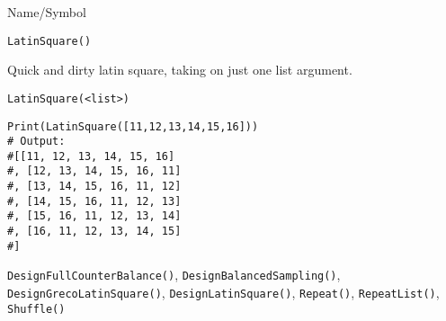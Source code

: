 \begin{desc}{Name/Symbol}
\item[Name/Symbol]	\verb+LatinSquare()+

\item[Description]	Quick and dirty latin square, taking on just one
  list argument.

\item[Usage]
\begin{verbatim}
LatinSquare(<list>)
\end{verbatim}

\item[Example]
\begin{verbatim}
Print(LatinSquare([11,12,13,14,15,16]))
# Output:
#[[11, 12, 13, 14, 15, 16]
#, [12, 13, 14, 15, 16, 11]
#, [13, 14, 15, 16, 11, 12]
#, [14, 15, 16, 11, 12, 13]
#, [15, 16, 11, 12, 13, 14]
#, [16, 11, 12, 13, 14, 15]
#]

\end{verbatim}

\item[See Also] \verb+DesignFullCounterBalance()+,
  \verb+DesignBalancedSampling()+, \verb+DesignGrecoLatinSquare()+,
  \verb+DesignLatinSquare()+, \verb+Repeat()+, \verb+RepeatList()+,
  \verb+Shuffle()+

\end{desc}



